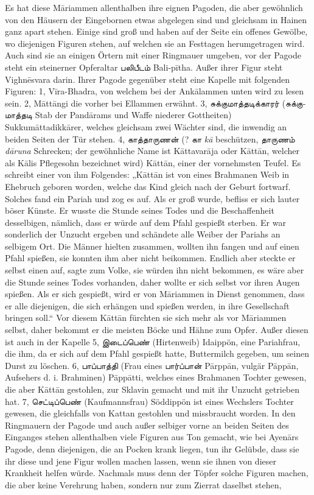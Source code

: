 \documentclass{article}
\newcommand{\TamilText}[1]{\texttamil{#1}}
\newcommand{\tam}[1]{\TamilText{#1}}
\begin{document}
Es hat diese M\={a}riammen allenthalben ihre eignen Pagoden, die aber gewöhnlich von den Häusern der Eingebornen etwas abgelegen sind und gleichsam in Hainen ganz apart stehen. Einige sind groß und haben auf der Seite ein offenes Gewölbe, wo diejenigen Figuren stehen, auf welchen sie an Festtagen herumgetragen wird. Auch sind sie an einigen Örtern mit einer Ringmauer umgeben, vor der Pagode steht ein steinerner Opferaltar \tam{பலிபீடம்} Bali-p\={i}tha. Außer ihrer Figur steht Vighn\={e}svara darin. Ihrer Pagode gegenüber steht eine Kapelle mit folgenden Figuren: 1, V\={i}ra-Bhadra, von welchem bei der Ank\={a}lammen unten wird zu lesen sein. 2, M\={a}tt\={a}ngi die vorher bei Ellammen erwähnt. 3, \tam{சுக்குமாத்தடிக்காரர்} (\tam{சுக்குமாத்தடி} Stab der Pand\={a}rams und Waffe niederer Gottheiten) Sukkum\={a}ttadikk\={a}rer, welches gleichsam zwei Wächter sind, die inwendig an beiden Seiten der Tür stehen. 4, \tam{காத்தாருணன்} (? \tam{கா} \emph{k\={a}} beschützen, \tam{தாருணம்} \emph{d\={a}runa} Schrecken; der gewöhnliche Name ist K\={a}ttavar\={a}ja oder K\={a}tt\={a}n, welcher als K\={a}lis Pflegesohn bezeichnet wird) K\={a}tt\={a}n, einer der vornehmsten Teufel. Es schreibt einer von ihm Folgendes: „K\={a}tt\={a}n ist von eines Brahmanen Weib in Ehebruch geboren worden, welche das Kind gleich nach der Geburt fortwarf. Solches fand ein Pariah und zog es auf. Als er groß wurde, befliss er sich lauter böser Künste. Er wusste die Stunde seines Todes und die Beschaffenheit desselbigen, nämlich, dass er würde auf dem Pfahl gespießt sterben. Er war sonderlich der Unzucht ergeben und schändete alle Weiber der Pariahs an selbigem Ort. Die Männer hielten zusammen, wollten ihn fangen und auf einen Pfahl spießen, sie konnten ihm aber nicht beikommen. Endlich aber steckte er selbst einen auf, sagte zum Volke, sie würden ihn nicht bekommen, es wäre aber die Stunde seines Todes vorhanden, daher wollte er sich selbst vor ihren Augen spießen. Als er sich gespießt, wird er von M\={a}riammen in Dienst genommen, dass er alle diejenigen, die sich erhängen und spießen werden, in ihre Gesellschaft bringen soll.“ Vor diesem K\={a}tt\={a}n fürchten sie sich mehr als vor M\={a}riammen selbst, daher bekommt er die meisten Böcke und Hähne zum Opfer. Außer diesen ist auch in der Kapelle 5, \tam{இடைப்பெண்} (Hirtenweib) Idaippön, eine Pariahfrau, die ihm, da er sich auf dem Pfahl gespießt hatte, Buttermilch gegeben, um seinen Durst zu löschen. 6, \tam{பாப்பாத்தி} (Frau eines \tam{பார்ப்பான்} P\={a}rpp\={a}n, vulgär P\={a}pp\={a}n, Aufsehers d. i. Brahminen) P\={a}pp\={a}tti, welches eines Brahmanen Tochter gewesen, die aber K\={a}tt\={a}n gestohlen, zur Sklavin gemacht und mit ihr Unzucht getrieben hat. 7, \tam{செட்டிப்பெண்} (Kaufmannsfrau) Söddippön ist eines Wechslers Tochter gewesen, die gleichfalls von Kattan gestohlen und missbraucht worden. In den Ringmauern der Pagode und auch außer selbiger vorne an beiden Seiten des Einganges stehen allenthalben viele Figuren aus Ton gemacht, wie bei Ayen\={a}rs Pagode, denn diejenigen, die an Pocken krank liegen, tun ihr Gelübde, dass sie ihr diese und jene Figur wollen machen lassen, wenn sie ihnen von dieser Krankheit helfen würde. Nachmals muss denn der Töpfer solche Figuren machen, die aber keine Verehrung haben, sondern nur zum Zierrat daselbst stehen, 
\end{document}
